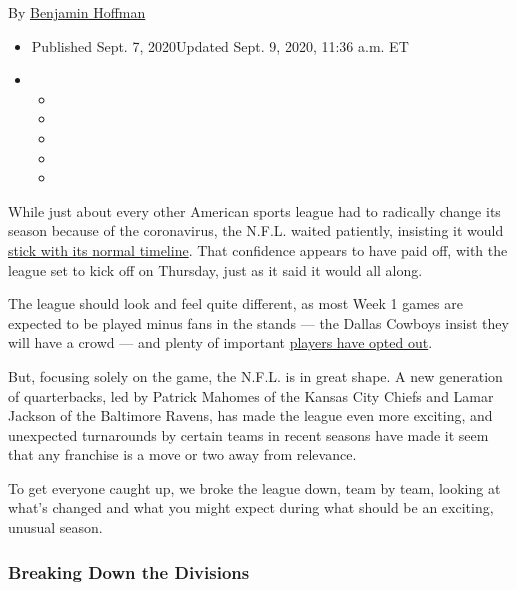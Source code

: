 By
\href{https://www.nytimes3xbfgragh.onion/by/benjamin-hoffman}{Benjamin
Hoffman}

\begin{itemize}
\item
  Published Sept. 7, 2020Updated Sept. 9, 2020, 11:36 a.m. ET
\item
  \begin{itemize}
  \item
  \item
  \item
  \item
  \item
  \end{itemize}
\end{itemize}

While just about every other American sports league had to radically
change its season because of the coronavirus, the N.F.L. waited
patiently, insisting it would
\href{https://www.nytimes3xbfgragh.onion/2020/05/07/sports/football/nfl-schedule.html}{stick
with its normal timeline}. That confidence appears to have paid off,
with the league set to kick off on Thursday, just as it said it would
all along.

The league should look and feel quite different, as most Week 1 games
are expected to be played minus fans in the stands --- the Dallas
Cowboys insist they will have a crowd --- and plenty of important
\href{https://www.nytimes3xbfgragh.onion/2020/08/08/sports/football/nfl-players-opt-out.html}{players
have opted out}.

But, focusing solely on the game, the N.F.L. is in great shape. A new
generation of quarterbacks, led by Patrick Mahomes of the Kansas City
Chiefs and Lamar Jackson of the Baltimore Ravens, has made the league
even more exciting, and unexpected turnarounds by certain teams in
recent seasons have made it seem that any franchise is a move or two
away from relevance.

To get everyone caught up, we broke the league down, team by team,
looking at what's changed and what you might expect during what should
be an exciting, unusual season.

\hypertarget{breaking-down-the-divisions}{%
\subsubsection{Breaking Down the
Divisions}\label{breaking-down-the-divisions}}

